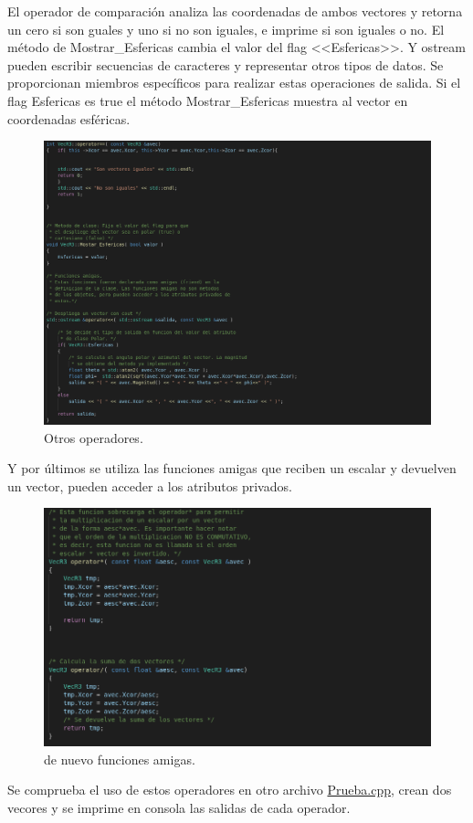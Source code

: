 \documentclass[11pt]{article}
\begin{document}
	El operador de comparación analiza las coordenadas de ambos vectores y retorna un cero si son guales y uno si no son iguales, e imprime si son iguales o no.  El método de Mostrar\_Esfericas cambia el valor del flag <<Esfericas>>. Y ostream pueden escribir secuencias de caracteres y representar otros tipos de datos. Se proporcionan miembros específicos para realizar estas operaciones de salida. Si el flag Esfericas es true el método Mostrar\_Esfericas muestra al vector en coordenadas esféricas.
	
	
	
	\begin{figure}[H]
		\centering
		\includegraphics[width=0.7\linewidth]{img7}
		\caption{Otros operadores. }
	\end{figure}

Y por últimos se utiliza las funciones amigas que reciben un escalar y devuelven un vector, pueden acceder a los atributos privados.

	\begin{figure}[H]
	\centering
	\includegraphics[width=0.7\linewidth]{img8}
	\caption{de nuevo funciones amigas. }
\end{figure}

Se comprueba el uso de estos operadores en otro archivo \href{https://github.com/Mohs9/Lab-Avanzado/blob/eee254f75da3f1da0648a65ce5d045611bca5708/Tareas/T1_II_3/prueba.cpp}{Prueba.cpp}, crean dos vecores y se imprime en consola las salidas de cada operador.
\end{document}
